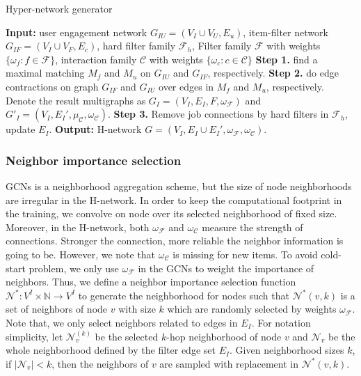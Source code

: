 \documentclass[manuscript,screen,review]{acmart}
\newcommand\Fcal{\mathcal{F}}
\newcommand\Ucal{\mathcal{U}}
\newcommand{\ubf}{\bm{u}}
\newcommand{\Ccal}{\mathcal{C}}
\newcommand{\Ncal}{\mathcal{N}}
\begin{document}
\begin{algorithm}[h]
\caption{Hyper-network generator}
\begin{algorithmic}[1]\label{al:hnet}
\STATE \textbf{Input:} user engagement network $G_{IU}=(V_I\cup V_U,E_u)$,
item-filter network $G_{IF}=(V_I\cup V_F,E_c)$, 
hard filter family $\mathcal{F}_h$,
Filter family $\mathcal{F}$ with weights $\{\omega_f:f\in\mathcal{F}\}$,
interaction family $\mathcal{C}$ with weights $\{\omega_c:c\in\mathcal{C}\}$
\STATE \textbf{Step 1.} find a maximal matching $M_f$ and $M_u$ on $G_{IU}$ and $G_{IF}$, respectively.
\STATE \textbf{Step 2.} do edge contractions on graph $G_{IF}$ and $G_{IU}$ over edges in $M_f$ and $M_u$, respectively. Denote the result multigraphs as $G_I=(V_I,E_I,F,\omega_{\mathcal{F}})$ and $G'_I=(V_I,E_I',\mu_{\mathcal{C}},\omega_{\mathcal{C}})$.
\STATE \textbf{Step 3.} Remove job connections by hard filters in $\mathcal{F}_h$, update $E_I$.
\STATE 
\textbf{Output:} H-network $G=(V_I,E_I\cup E_I',\omega_{\mathcal{F}},\omega_{\mathcal{C}})$.
\end{algorithmic}
\end{algorithm}
\vspace*{-2.5mm}
\subsubsection{Neighbor importance selection} 
GCNs is a neighborhood aggregation scheme, but the size of node neighborhoods are irregular in the H-network. In order to keep the computational footprint in the training, we convolve on node over its selected  neighborhood of fixed size. Moreover, in the H-network, both $\omega_{\Fcal}$ and $\omega_{\Ccal}$ measure the strength of connections. Stronger the connection, more reliable the neighbor information is going to be.
However, we note that $\omega_{\Ccal}$ is missing for new items.
To avoid cold-start problem, we only use $\omega_{\Fcal}$ in the GCNs to weight the importance of neighbors.
Thus, we define a neighbor importance selection function $\Ncal^*: V^I\times\mathbb{N}\to V^I$ to generate the neighborhood for nodes such that $\Ncal^*(v,k)$ is a set of neighbors of node $v$ with size $k$ which are randomly selected by weights $\omega_{\Fcal}$.
Note that, we only select neighbors related to edges in $E_I$.  For notation simplicity, let $\Ncal^{(k)}_v$ be the selected $k$-hop neighborhood of node $v$ and $\Ncal_v$ be the whole neighborhood defined by the filter edge set $E_I$. Given neighborhood sizes $k$,  if $|\Ncal_v|< k$, then the neighbors of $v$ are sampled with replacement in $\Ncal^*(v,k)$. 
\end{document}

